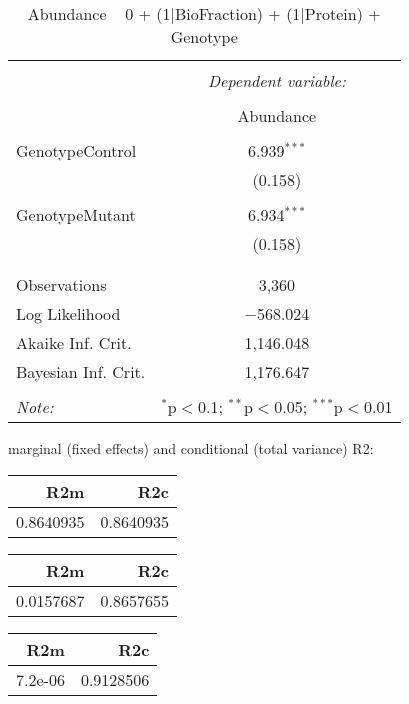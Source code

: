 \documentclass[11pt]{report}
\begin{document}
\begin{table}[!htbp] \centering 
  \caption{Abundance ~ 0 + (1|BioFraction) + (1|Protein) + Genotype} 
  \label{} 
\begin{tabular}{@{\extracolsep{5pt}}lc} 
\\[-1.8ex]\hline 
\hline \\[-1.8ex] 
 & \multicolumn{1}{c}{\textit{Dependent variable:}} \\ 
\cline{2-2} 
\\[-1.8ex] & Abundance \\ 
\hline \\[-1.8ex] 
 GenotypeControl & 6.939$^{***}$ \\ 
  & (0.158) \\ 
  & \\ 
 GenotypeMutant & 6.934$^{***}$ \\ 
  & (0.158) \\ 
  & \\ 
\hline \\[-1.8ex] 
Observations & 3,360 \\ 
Log Likelihood & $-$568.024 \\ 
Akaike Inf. Crit. & 1,146.048 \\ 
Bayesian Inf. Crit. & 1,176.647 \\ 
\hline 
\hline \\[-1.8ex] 
\textit{Note:}  & \multicolumn{1}{r}{$^{*}$p$<$0.1; $^{**}$p$<$0.05; $^{***}$p$<$0.01} \\ 
\end{tabular} 
\end{table} 
marginal (fixed effects) and conditional (total variance) R2:

\begin{tabular}{r|r}
\hline
R2m & R2c\\
\hline
0.8640935 & 0.8640935\\
\hline
\end{tabular}

\begin{tabular}{r|r}
\hline
R2m & R2c\\
\hline
0.0157687 & 0.8657655\\
\hline
\end{tabular}

\begin{tabular}{r|r}
\hline
R2m & R2c\\
\hline
7.2e-06 & 0.9128506\\
\hline
\end{tabular}
\end{document}
